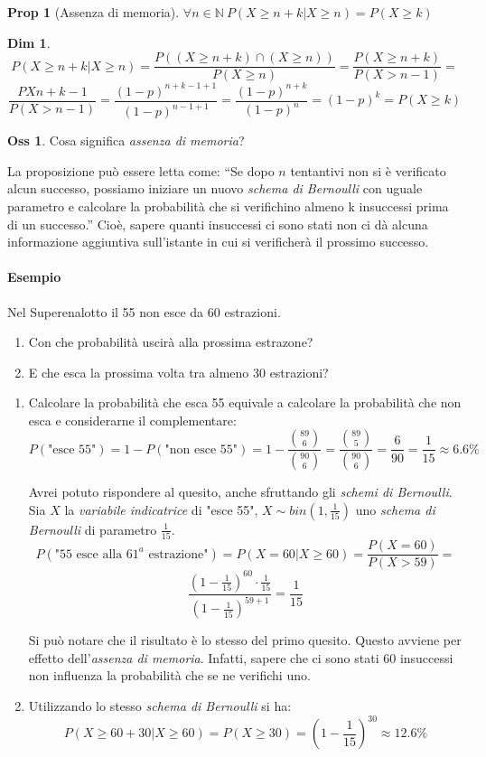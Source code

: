 \documentclass[12pt, a4paper]{report}
\theoremstyle{definition}
\newtheorem*{demonstration}{Dim}
\newtheorem*{proposition}{Prop}
\newtheorem*{observation}{Oss}
\DeclareRobustCommand{\N}{\mathbb{N}}%
\begin{document}
\begin{proposition}[Assenza di memoria]
	\(\forall n\in\N\ P(X\geq n+k|X\geq n)=P(X\geq k)\)
\end{proposition}
\begin{demonstration}
	\[P(X\geq n+k|X\geq n)=\frac{P((X\geq n+k)\cap(X\geq n))}{P(X\geq n)}=\frac
	{P(X\geq n+k)}{P(X>n-1)}=\]
	\[\frac{PXn+k-1}{P(X>n-1)}=\frac{(1-p)^{n+k-1+1}}{(1-p)^{n-1+1}}=\frac{(1-p)
	^{n+k}}{(1-p)^n}=(1-p)^k=P(X\geq k)\]
\end{demonstration}

\begin{observation}
	Cosa significa \emph{assenza di memoria}?

	La proposizione può essere letta come:
	\enquote{Se dopo $n$ tentantivi non si è verificato alcun successo, possiamo
	iniziare un nuovo \emph{schema di Bernoulli} con uguale parametro e calcolare
	la probabilità che si verifichino almeno k insuccessi prima di un successo.}
	Cioè, sapere quanti insuccessi ci sono stati non ci dà alcuna informazione
	aggiuntiva sull'istante in cui si verificherà il prossimo successo.
\end{observation}

\paragraph*{Esempio}
Nel Superenalotto il 55 non esce da 60 estrazioni.
\begin{enumerate}
	\item Con che probabilità uscirà alla prossima estrazone?
	\item E che esca la prossima volta tra almeno 30 estrazioni?
\end{enumerate}
\begin{enumerate}
	\item Calcolare la probabilità che esca 55 equivale a calcolare la probabilità
	che non esca e considerarne il complementare:
	\[P(\text{"esce 55"})=1-P(\text{"non esce 55"})=1-\frac{\binom{89}{6}}
	{\binom{90}{6}}=\frac{\binom{89}{5}}{\binom{90}{6}}=\frac{6}{90}=\frac{1}{15}
	\approx 6.6\%\]
	
	Avrei potuto rispondere al quesito, anche sfruttando gli \emph{schemi di
	Bernoulli}.\\	
	Sia $X$ la \emph{variabile indicatrice} di "esce 55", \(X\sim bin(1,\frac{1}
	{15})\) uno \emph{schema di Bernoulli} di parametro $\frac{1}{15}$.
	\[P(\text{"55 esce alla $61^a$ estrazione"})=P(X=60|X\geq 60)=\frac{P(X=60)}
	{P(X>59)}=\]
	\[\frac{(1-\frac{1}{15})^{60}\cdot \frac{1}{15}}{(1-\frac{1}{15})^{59+1}}=
	\frac{1}{15}\]

	Si può notare che il risultato è lo stesso del primo quesito. Questo avviene
	per effetto dell'\emph{assenza di memoria}. Infatti, sapere che ci sono stati
	60 insuccessi non influenza la probabilità che se ne verifichi uno.
	\item Utilizzando lo stesso \emph{schema di Bernoulli} si ha:
	\[P(X\geq 60+30|X\geq 60)=P(X\geq 30)=(1-\frac{1}{15})^{30}\approx 12.6\%\]
\end{enumerate}
\end{document}
